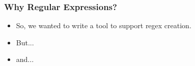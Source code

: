 \begin{frame}
\frametitle{Why Regular Expressions?}

\begin{itemize}
\item So, we wanted to write a tool to support regex creation.
\item<2-> But... 
\end{itemize}



\begin{itemize}
\item<4-> and...
\end{itemize}


\end{frame}


